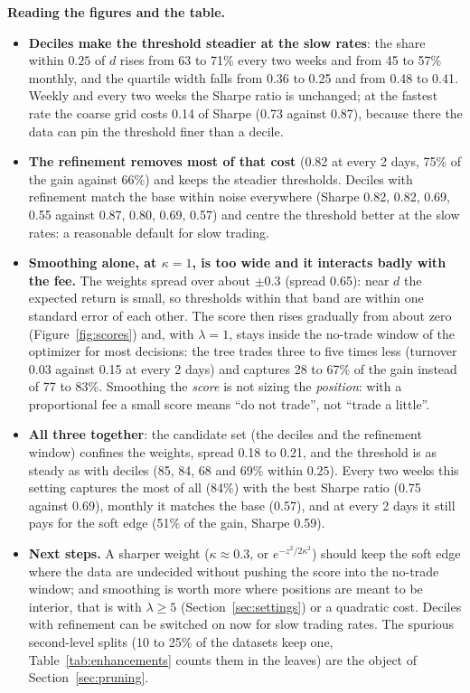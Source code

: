 \documentclass[11pt,a4paper]{article}
\newcommand{\1}{\mathbf{1}}
\begin{document}
\textbf{Reading the figures and the table.}
\begin{itemize}\setlength{\itemsep}{1pt}
\item \textbf{Deciles make the threshold steadier at the slow rates}: the share within $0.25$ of $d$ rises from 63 to 71\% every two weeks and from 45 to 57\% monthly, and the quartile width falls from 0.36 to 0.25 and from 0.48 to 0.41. Weekly and every two weeks the Sharpe ratio is unchanged; at the fastest rate the coarse grid costs 0.14 of Sharpe (0.73 against 0.87), because there the data can pin the threshold finer than a decile.
\item \textbf{The refinement removes most of that cost} (0.82 at every 2 days, 75\% of the gain against 66\%) and keeps the steadier thresholds. Deciles with refinement match the base within noise everywhere (Sharpe 0.82, 0.82, 0.69, 0.55 against 0.87, 0.80, 0.69, 0.57) and centre the threshold better at the slow rates: a reasonable default for slow trading.
\item \textbf{Smoothing alone, at $\kappa=1$, is too wide and it interacts badly with the fee.} The weights spread over about $\pm0.3$ (spread 0.65): near $d$ the expected return is small, so thresholds within that band are within one standard error of each other. The score then rises gradually from about zero (Figure~\ref{fig:scores}) and, with $\lambda=1$, stays inside the no-trade window of the optimizer for most decisions: the tree trades three to five times less (turnover 0.03 against 0.15 at every 2 days) and captures 28 to 67\% of the gain instead of 77 to 83\%. Smoothing the \emph{score} is not sizing the \emph{position}: with a proportional fee a small score means ``do not trade'', not ``trade a little''.
\item \textbf{All three together}: the candidate set (the deciles and the refinement window) confines the weights, spread 0.18 to 0.21, and the threshold is as steady as with deciles (85, 84, 68 and 69\% within $0.25$). Every two weeks this setting captures the most of all (84\%) with the best Sharpe ratio (0.75 against 0.69), monthly it matches the base (0.57), and at every 2 days it still pays for the soft edge (51\% of the gain, Sharpe 0.59).
\item \textbf{Next steps.} A sharper weight ($\kappa\approx0.3$, or $e^{-z^2/2\kappa^2}$) should keep the soft edge where the data are undecided without pushing the score into the no-trade window; and smoothing is worth more where positions are meant to be interior, that is with $\lambda\ge5$ (Section~\ref{sec:settings}) or a quadratic cost. Deciles with refinement can be switched on now for slow trading rates. The spurious second-level splits (10 to 25\% of the datasets keep one, Table~\ref{tab:enhancements} counts them in the leaves) are the object of Section~\ref{sec:pruning}.
\end{itemize}
\end{document}
